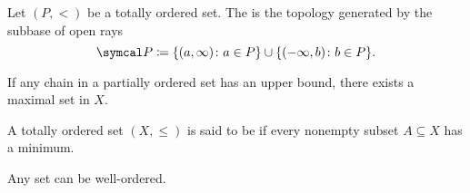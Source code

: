 \begin{definition}\label{def:order_topology}\cite{nLab:order_topology}
  Let \( (P, <) \) be a totally ordered set. The  is the topology generated by the subbase of open rays
  \begin{equation*}
    \Cal{P} \coloneqq \{ (a, \infty) \colon a \in P \} \cup \{ (-\infty, b) \colon b \in P \}.
  \end{equation*}
\end{definition}

\begin{lemma}\label{thm:zorns_lemma}\cite{nLab:zorns_lemma}
  If any chain in a partially ordered set has an upper bound, there exists a maximal set in \( X \).
\end{lemma}

\begin{definition}\label{def:well_ordered_set}
  A totally ordered set \( (X, \leq) \) is said to be  if every nonempty subset \( A \subseteq X \) has a minimum.
\end{definition}

\begin{theorem}\label{thm:well_ordering_principle}\cite[196]{Enderton1977}
  Any set can be well-ordered.
\end{theorem}
